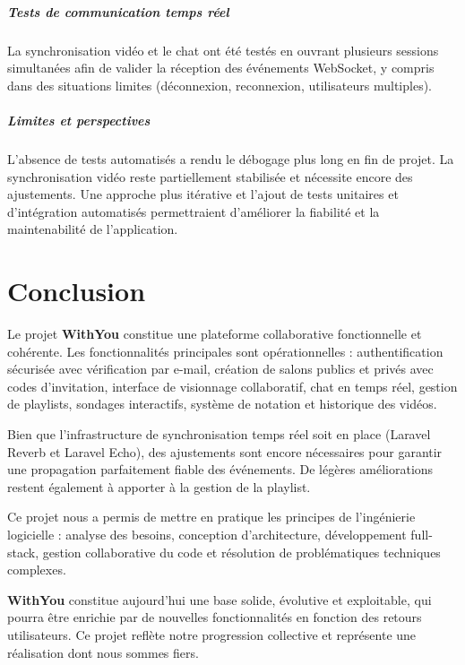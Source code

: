 \documentclass[12pt,a4paper]{report}
\begin{document}
\paragraph{Tests de communication temps réel}
La synchronisation vidéo et le chat ont été testés en ouvrant plusieurs sessions simultanées afin de valider la réception des événements WebSocket, y compris dans des situations limites (déconnexion, reconnexion, utilisateurs multiples).

\paragraph{Limites et perspectives}
L’absence de tests automatisés a rendu le débogage plus long en fin de projet. La synchronisation vidéo reste partiellement stabilisée et nécessite encore des ajustements. Une approche plus itérative et l’ajout de tests unitaires et d’intégration automatisés permettraient d’améliorer la fiabilité et la maintenabilité de l’application.

\chapter{Conclusion}

Le projet \textbf{WithYou} constitue une plateforme collaborative fonctionnelle et cohérente. Les fonctionnalités principales sont opérationnelles : authentification sécurisée avec vérification par e-mail, création de salons publics et privés avec codes d’invitation, interface de visionnage collaboratif, chat en temps réel, gestion de playlists, sondages interactifs, système de notation et historique des vidéos.

Bien que l’infrastructure de synchronisation temps réel soit en place (Laravel Reverb et Laravel Echo), des ajustements sont encore nécessaires pour garantir une propagation parfaitement fiable des événements. De légères améliorations restent également à apporter à la gestion de la playlist.

Ce projet nous a permis de mettre en pratique les principes de l’ingénierie logicielle : analyse des besoins, conception d’architecture, développement full-stack, gestion collaborative du code et résolution de problématiques techniques complexes.

\textbf{WithYou} constitue aujourd’hui une base solide, évolutive et exploitable, qui pourra être enrichie par de nouvelles fonctionnalités en fonction des retours utilisateurs. Ce projet reflète notre progression collective et représente une réalisation dont nous sommes fiers.
\end{document}
